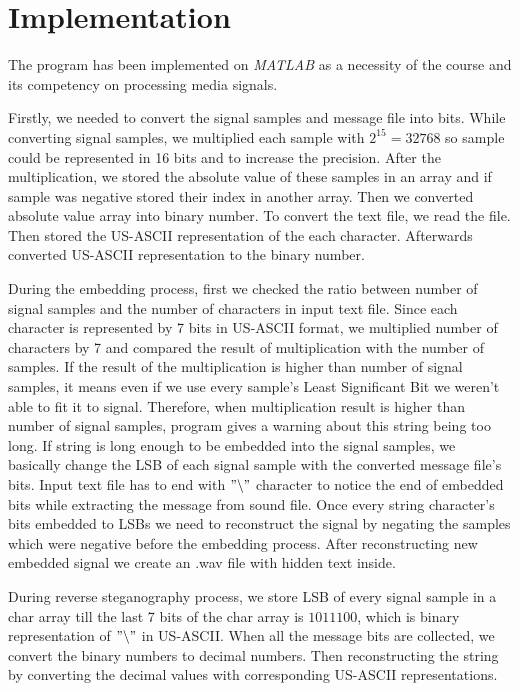 \documentclass[twocolumns]{IEEEtran}
\begin{document}
	\section{Implementation}
	The program has been implemented on \textit{MATLAB} as a necessity of the course and its competency on processing media signals.
	
	Firstly, we needed to convert the signal samples and message file into bits. While converting  signal samples, we multiplied each sample with $2^{15} = 32768$ so sample could be represented in 16 bits and to increase the precision. After the multiplication, we stored the absolute value of these samples in an array and if sample was negative stored their index in another array. Then we converted absolute value array into binary number. To convert the text file, we read the file. Then stored the US-ASCII representation of the each character. Afterwards converted US-ASCII representation to the binary number.
	
	During the embedding process, first we checked the ratio between number of signal samples and the number of characters in input text file. Since each character is represented by 7 bits in US-ASCII format, we multiplied number of characters by 7 and compared the result of multiplication with the number of samples. If the result of the multiplication is higher than number of signal samples, it means even if we use every sample's Least Significant Bit we weren't able to fit it to signal. Therefore, when multiplication result is higher than number of signal samples, program gives a warning about this string being too long. If string is long enough to be embedded into the signal samples, we basically change the LSB of each signal sample with the converted message file's bits. Input text file has to end with $"\backslash "$ character to notice the end of embedded bits while extracting the message from sound file. Once every string character's bits embedded to LSBs we need to reconstruct the signal by negating the samples which were negative before the embedding process. After reconstructing new embedded signal we create an .wav file with hidden text inside.
	
	During reverse steganography process, we store LSB of every signal sample in a char array till the last 7 bits of the char array is $1011100$, which is binary representation of $"\backslash"$ in US-ASCII. When all the message bits are collected, we convert the binary numbers to decimal numbers. Then reconstructing the string by converting the decimal values with corresponding US-ASCII representations.
	
\end{document}

